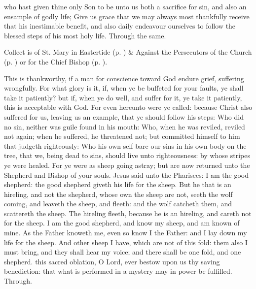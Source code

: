\collect
{} who hast given thine only Son to be unto us both a sacrifice for sin, and also an ensample of godly life; Give us grace that we may always most thankfully receive that his inestimable benefit, and also daily endeavour ourselves to follow the blessed steps of his most holy life. Through the same.
\begin{rubric}
     Collect is of St. Mary in Eastertide (p. \pageref{SPMaryInEaster}) \&  Against the Persecutors of the Church (p. \pageref{SPAgainst}) or for the Chief Bishop (p. \pageref{SPChiefBishop}).
\end{rubric}
 This is thankworthy, if a man for conscience toward God endure grief, suffering wrongfully. For what glory is it, if, when ye be buffeted for your faults, ye shall take it patiently? but if, when ye do well, and suffer for it, ye take it patiently, this is acceptable with God. For even hereunto were ye called: because Christ also suffered for us, leaving us an example, that ye should follow his steps: Who did no sin, neither was guile found in his mouth: Who, when he was reviled, reviled not again; when he suffered, he threatened not; but committed himself to him that judgeth righteously: Who his own self bare our sins in his own body on the tree, that we, being dead to sins, should live unto righteousness: by whose stripes ye were healed. For ye were as sheep going astray; but are now returned unto the Shepherd and Bishop of your souls.
 Jesus said unto the Pharisees: I am the good shepherd: the good shepherd giveth his life for the sheep. But he that is an hireling, and not the shepherd, whose own the sheep are not, seeth the wolf coming, and leaveth the sheep, and fleeth: and the wolf catcheth them, and scattereth the sheep. The hireling fleeth, because he is an hireling, and careth not for the sheep. I am the good shepherd, and know my sheep, and am known of mine. As the Father knoweth me, even so know I the Father: and I lay down my life for the sheep. And other sheep I have, which are not of this fold: them also I must bring, and they shall hear my voice; and there shall be one fold, and one shepherd.
\secret
{} this sacred oblation, O Lord, ever bestow upon us thy saving benediction: that what is performed in a mystery may in power be fulfilled. Through.
